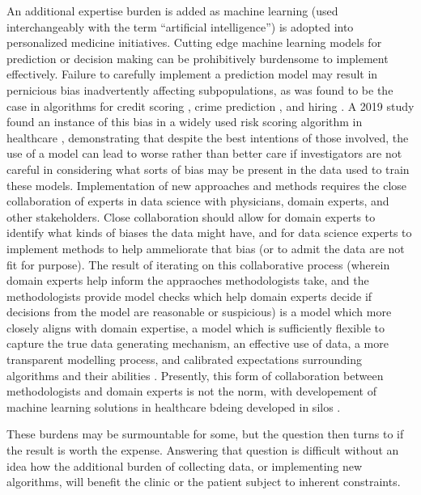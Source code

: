 
An additional expertise burden is added as machine learning (used interchangeably with the term “artificial intelligence”) is adopted into personalized medicine initiatives.  Cutting edge machine learning models for prediction or decision making can be prohibitively burdensome to implement effectively. Failure to carefully implement a prediction model may result in pernicious bias inadvertently affecting subpopulations, as was found to be the case in algorithms for credit scoring \cite{barocas2016big}, crime prediction \cite{lum2016predict}, and hiring \cite{ajunwa2020paradox}.  A 2019 study found an instance of this bias in a widely used risk scoring algorithm in healthcare \cite{obermeyer2019dissecting}, demonstrating that despite the best intentions of those involved, the use of a model can lead to worse rather than better care if investigators are not careful in considering what sorts of bias may be present in the data used to train these models.  Implementation of new approaches and methods requires the close collaboration of experts in data science  with physicians, domain experts, and other stakeholders.  Close collaboration should allow for domain experts to identify what kinds of biases the data might have, and for data science experts to implement methods to help ammeliorate that bias (or to admit the data are not fit for purpose).  The result of iterating on this collaborative process (wherein domain experts help inform the appraoches methodologists take, and the methodologists provide model checks which help domain experts decide if decisions from the model are reasonable or suspicious) is a model which more closely aligns with domain expertise, a model which is sufficiently flexible to capture the true data generating mechanism, an effective use of data, a more transparent modelling process, and calibrated expectations surrounding algorithms and their abilities \cite{frohlich2018hype}.  Presently, this form of collaboration between methodologists and domain experts is not the norm, with developement of machine learning solutions in healthcare bdeing developed in silos \cite{wiens2019no}.

These burdens may be surmountable for some, but the question then turns to if the result is worth the expense.  Answering that question is difficult without an idea how the additional burden of collecting data, or implementing new algorithms, will benefit the clinic or the patient subject to inherent constraints. 

